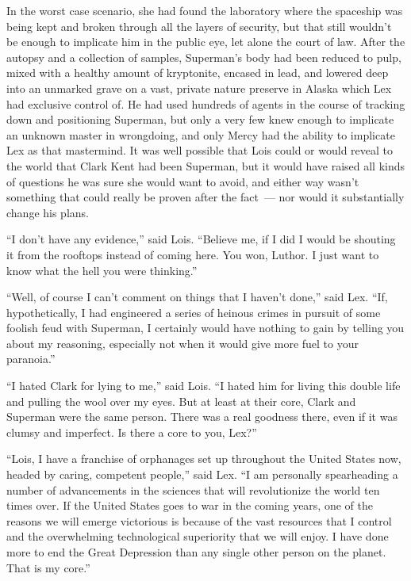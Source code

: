 \documentclass[ebook,12pt]{memoir}
\begin{document}
In the worst case scenario, she had found the laboratory where the
spaceship was being kept and broken through all the layers of security,
but that still wouldn't be enough to implicate him in the public eye,
let alone the court of law. After the autopsy and a collection of
samples, Superman's body had been reduced to pulp, mixed with a healthy
amount of kryptonite, encased in lead, and lowered deep into an unmarked
grave on a vast, private nature preserve in Alaska which Lex had
exclusive control of. He had used hundreds of agents in the course of
tracking down and positioning Superman, but only a very few knew enough
to implicate an unknown master in wrongdoing, and only Mercy had the
ability to implicate Lex as that mastermind. It was well possible that
Lois could or would reveal to the world that Clark Kent had been
Superman, but it would have raised all kinds of questions he was sure
she would want to avoid, and either way wasn't something that could
really be proven after the fact~--- nor would it substantially change
his plans.

``I don't have any evidence,'' said Lois. ``Believe me, if I did I would
be shouting it from the rooftops instead of coming here. You won,
Luthor. I just want to know what the hell you were thinking.''

``Well, of course I can't comment on things that I haven't done,'' said
Lex. ``If, hypothetically, I had engineered a series of heinous crimes
in pursuit of some foolish feud with Superman, I certainly would have
nothing to gain by telling you about my reasoning, especially not when
it would give more fuel to your paranoia.''

``I hated Clark for lying to me,'' said Lois. ``I hated him for living
this double life and pulling the wool over my eyes. But at least at
their core, Clark and Superman were the same person. There was a real
goodness there, even if it was clumsy and imperfect. Is there a core to
you, Lex?''

``Lois, I have a franchise of orphanages set up throughout the United
States now, headed by caring, competent people,'' said Lex. ``I am
personally spearheading a number of advancements in the sciences that
will revolutionize the world ten times over. If the United States goes
to war in the coming years, one of the reasons we will emerge victorious
is because of the vast resources that I control and the overwhelming
technological superiority that we will enjoy. I have done more to end
the Great Depression than any single other person on the planet. That is
my core.''
\end{document}
